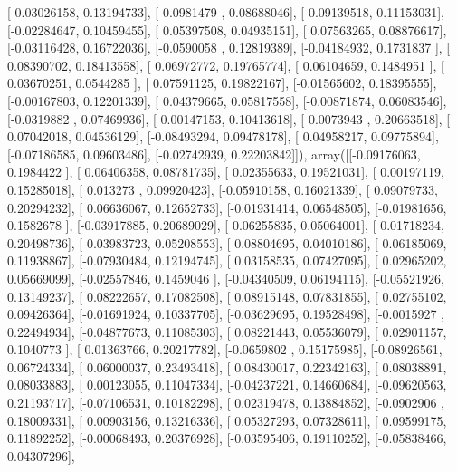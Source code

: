 \documentclass{article}
\begin{document}
       [-0.03026158,  0.13194733],
       [-0.0981479 ,  0.08688046],
       [-0.09139518,  0.11153031],
       [-0.02284647,  0.10459455],
       [ 0.05397508,  0.04935151],
       [ 0.07563265,  0.08876617],
       [-0.03116428,  0.16722036],
       [-0.0590058 ,  0.12819389],
       [-0.04184932,  0.1731837 ],
       [ 0.08390702,  0.18413558],
       [ 0.06972772,  0.19765774],
       [ 0.06104659,  0.1484951 ],
       [ 0.03670251,  0.0544285 ],
       [ 0.07591125,  0.19822167],
       [-0.01565602,  0.18395555],
       [-0.00167803,  0.12201339],
       [ 0.04379665,  0.05817558],
       [-0.00871874,  0.06083546],
       [-0.0319882 ,  0.07469936],
       [ 0.00147153,  0.10413618],
       [ 0.0073943 ,  0.20663518],
       [ 0.07042018,  0.04536129],
       [-0.08493294,  0.09478178],
       [ 0.04958217,  0.09775894],
       [-0.07186585,  0.09603486],
       [-0.02742939,  0.22203842]]), array([[-0.09176063,  0.1984422 ],
       [ 0.06406358,  0.08781735],
       [ 0.02355633,  0.19521031],
       [ 0.00197119,  0.15285018],
       [ 0.013273  ,  0.09920423],
       [-0.05910158,  0.16021339],
       [ 0.09079733,  0.20294232],
       [ 0.06636067,  0.12652733],
       [-0.01931414,  0.06548505],
       [-0.01981656,  0.1582678 ],
       [-0.03917885,  0.20689029],
       [ 0.06255835,  0.05064001],
       [ 0.01718234,  0.20498736],
       [ 0.03983723,  0.05208553],
       [ 0.08804695,  0.04010186],
       [ 0.06185069,  0.11938867],
       [-0.07930484,  0.12194745],
       [ 0.03158535,  0.07427095],
       [ 0.02965202,  0.05669099],
       [-0.02557846,  0.1459046 ],
       [-0.04340509,  0.06194115],
       [-0.05521926,  0.13149237],
       [ 0.08222657,  0.17082508],
       [ 0.08915148,  0.07831855],
       [ 0.02755102,  0.09426364],
       [-0.01691924,  0.10337705],
       [-0.03629695,  0.19528498],
       [-0.0015927 ,  0.22494934],
       [-0.04877673,  0.11085303],
       [ 0.08221443,  0.05536079],
       [ 0.02901157,  0.1040773 ],
       [ 0.01363766,  0.20217782],
       [-0.0659802 ,  0.15175985],
       [-0.08926561,  0.06724334],
       [ 0.06000037,  0.23493418],
       [ 0.08430017,  0.22342163],
       [ 0.08038891,  0.08033883],
       [ 0.00123055,  0.11047334],
       [-0.04237221,  0.14660684],
       [-0.09620563,  0.21193717],
       [-0.07106531,  0.10182298],
       [ 0.02319478,  0.13884852],
       [-0.0902906 ,  0.18009331],
       [ 0.00903156,  0.13216336],
       [ 0.05327293,  0.07328611],
       [ 0.09599175,  0.11892252],
       [-0.00068493,  0.20376928],
       [-0.03595406,  0.19110252],
       [-0.05838466,  0.04307296],
\end{document}
